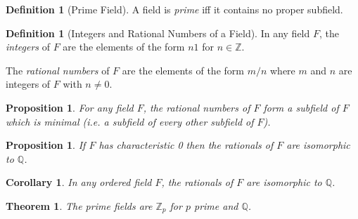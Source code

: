 \documentclass{article}
\newtheorem{proposition}[axiom]{Proposition}
\newtheorem{theorem}[axiom]{Theorem}
\newtheorem{corollary}{Corollary}[axiom]
\theoremstyle{definition}
\newtheorem{definition}[axiom]{Definition}
\begin{document}
    \begin{definition}[Prime Field]
        A field is \emph{prime} iff it contains no proper subfield.
    \end{definition}

    \begin{definition}[Integers and Rational Numbers of a Field]
        In any field $F$, the \emph{integers} of $F$ are the elements of the form $n1$ for $n \in \mathbb{Z}$.

        The \emph{rational numbers} of $F$ are the elements of the form $m/n$ where $m$ and $n$ are integers
        of $F$ with $n \neq 0$.
    \end{definition}

    \begin{proposition}
        For any field $F$, the rational numbers of $F$ form a subfield of $F$ which is minimal (i.e. a subfield
        of every other subfield of $F$).
    \end{proposition}

    \begin{proposition}
        If $F$ has characteristic 0 then the rationals of $F$ are isomorphic to $\mathbb{Q}$.
    \end{proposition}

    \begin{corollary}
        \label{cor:embed_rationals}
        In any ordered field $F$, the rationals of $F$ are isomorphic to $\mathbb{Q}$.
    \end{corollary}

    \begin{theorem}
        The prime fields are $\mathbb{Z}_p$ for $p$ prime and $\mathbb{Q}$.
    \end{theorem}
\end{document}
